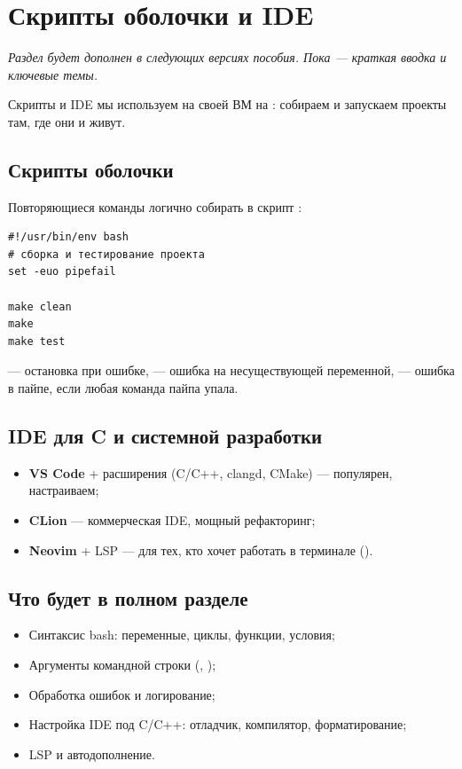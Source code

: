 \chapter{Скрипты оболочки и IDE}
\label{ch:27-scripting-ide}

\emph{Раздел будет дополнен в следующих версиях
пособия. Пока --- краткая вводка и ключевые темы.}

Скрипты и IDE мы используем на своей ВМ на :
собираем и запускаем проекты там, где они и живут.

\section{Скрипты оболочки}

Повторяющиеся команды логично собирать в скрипт
:
\begin{verbatim}
#!/usr/bin/env bash
# сборка и тестирование проекта
set -euo pipefail

make clean
make
make test
\end{verbatim}

 --- остановка при ошибке,
 --- ошибка на несуществующей
переменной,  --- ошибка в
пайпе, если любая команда пайпа упала.

\section{IDE для C и системной разработки}

\begin{itemize}
  \item \textbf{VS Code} + расширения (C/C++,
    clangd, CMake) --- популярен, настраиваем;
  \item \textbf{CLion} --- коммерческая IDE,
    мощный рефакторинг;
  \item \textbf{Neovim} + LSP --- для тех, кто
    хочет работать в терминале
    ().
\end{itemize}

\section{Что будет в полном разделе}
\begin{itemize}
  \item Синтаксис bash: переменные, циклы,
    функции, условия;
  \item Аргументы командной строки (,
    );
  \item Обработка ошибок и логирование;
  \item Настройка IDE под C/C++: отладчик,
    компилятор, форматирование;
  \item LSP и автодополнение.
\end{itemize}

